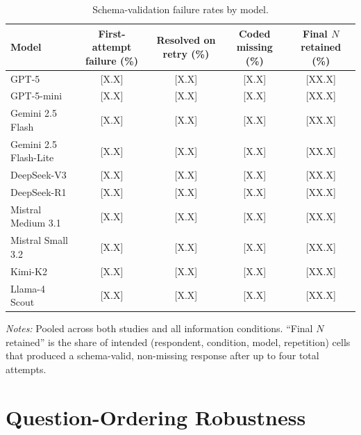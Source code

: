 \documentclass[12pt]{article}
\begin{document}
\begin{table}[h]
    \centering
    \caption{Schema-validation failure rates by model.}
    \label{tab:validation-rates}
    \begin{threeparttable}
    \begin{tabular}{lcccc}
        \toprule
        Model & First-attempt failure (\%) & Resolved on retry (\%) & Coded missing (\%) & Final $N$ retained (\%) \\
        \midrule
        GPT-5                  & [X.X] & [X.X] & [X.X] & [XX.X] \\
        GPT-5-mini             & [X.X] & [X.X] & [X.X] & [XX.X] \\
        Gemini 2.5 Flash       & [X.X] & [X.X] & [X.X] & [XX.X] \\
        Gemini 2.5 Flash-Lite  & [X.X] & [X.X] & [X.X] & [XX.X] \\
        DeepSeek-V3            & [X.X] & [X.X] & [X.X] & [XX.X] \\
        DeepSeek-R1            & [X.X] & [X.X] & [X.X] & [XX.X] \\
        Mistral Medium 3.1     & [X.X] & [X.X] & [X.X] & [XX.X] \\
        Mistral Small 3.2      & [X.X] & [X.X] & [X.X] & [XX.X] \\
        Kimi-K2                & [X.X] & [X.X] & [X.X] & [XX.X] \\
        Llama-4 Scout          & [X.X] & [X.X] & [X.X] & [XX.X] \\
        \bottomrule
    \end{tabular}
    \begin{tablenotes}\footnotesize
        \item \textit{Notes:} Pooled across both studies and all information conditions. ``Final $N$ retained'' is the share of intended (respondent, condition, model, repetition) cells that produced a schema-valid, non-missing response after up to four total attempts.
    \end{tablenotes}
    \end{threeparttable}
\end{table}

\section{Question-Ordering Robustness}\label{app:order-bias}
\end{document}
